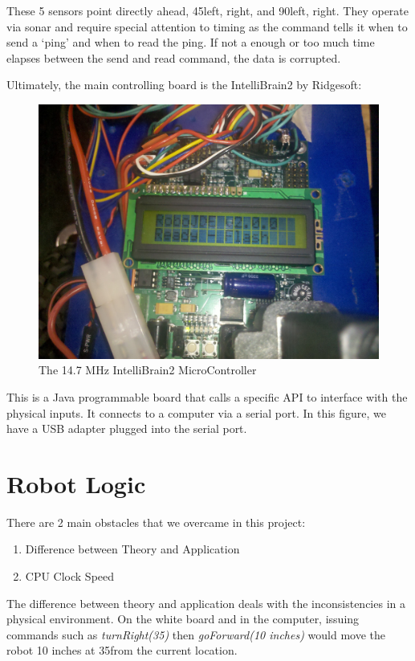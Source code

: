 \documentclass[12pt]{article}
\begin{document}
These 5 sensors point directly ahead, 45\textdegree \hspace{1mm}left, right, and 90\textdegree \hspace{1mm}left, right.  They operate via sonar and require special attention to timing as the command tells it when to send a `ping' and when to read the ping.  If not a enough or too much time elapses between the send and read command, the data is corrupted.

Ultimately, the main controlling board is the IntelliBrain2 by Ridgesoft: 
\begin{figure}[h]
\centerline{\includegraphics{img/intellibrain}}
\caption{The 14.7 MHz IntelliBrain2 MicroController}
\end{figure}

This is a Java programmable board that calls a specific API to interface with the physical inputs.  It connects to a computer via a serial port.  In this figure, we have a USB adapter plugged into the serial port. 


\clearpage
\section{Robot Logic}
There are 2 main obstacles that we overcame in this project:
\begin{enumerate}
\item Difference between Theory and Application
\item CPU Clock Speed
\end{enumerate}
The difference between theory and application deals with the inconsistencies in a physical environment.  On the white board and in the computer, issuing commands such as \textit{turnRight(35\textdegree)} then \textit{goForward(10 inches)} would move the robot 10 inches at 35\textdegree from the current location.  
\end{document}
